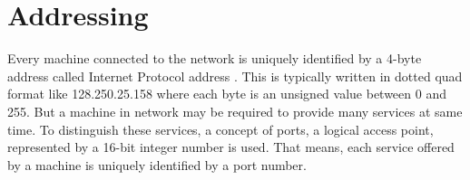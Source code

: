 \section{Addressing}
Every machine connected to the network is uniquely identified by a 4-byte address called Internet Protocol address . This is typically written in dotted quad format like 128.250.25.158 where each byte is an unsigned value between 0 and 255. But a machine in network may be required to provide many services at same time. To distinguish these services, a concept of ports, a logical access point, represented by a 16-bit integer number is used. That means, each service offered by a machine is uniquely identified by a port number.